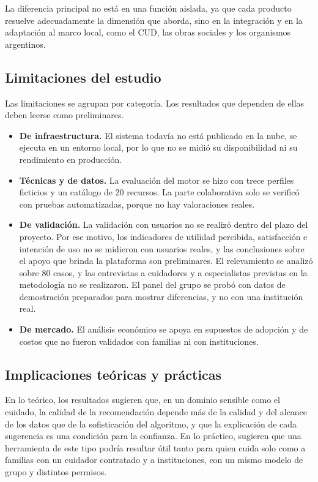 La diferencia principal no está en una función aislada, ya que cada producto resuelve adecuadamente la dimensión que aborda, sino en la integración y en la adaptación al marco local, como el CUD, las obras sociales y los organismos argentinos.

\subsection{Limitaciones del estudio}

Las limitaciones se agrupan por categoría. Los resultados que dependen de ellas deben leerse como preliminares.

\begin{itemize}
    \item \textbf{De infraestructura.} El sistema todavía no está publicado en la nube, se ejecuta en un entorno local, por lo que no se midió su disponibilidad ni su rendimiento en producción.
    \item \textbf{Técnicas y de datos.} La evaluación del motor se hizo con trece perfiles ficticios y un catálogo de 20 recursos. La parte colaborativa solo se verificó con pruebas automatizadas, porque no hay valoraciones reales.
    \item \textbf{De validación.} La validación con usuarios no se realizó dentro del plazo del proyecto. Por ese motivo, los indicadores de utilidad percibida, satisfacción e intención de uso no se midieron con usuarios reales, y las conclusiones sobre el apoyo que brinda la plataforma son preliminares. El relevamiento se analizó sobre 80 casos, y las entrevistas a cuidadores y a especialistas previstas en la metodología no se realizaron. El panel del grupo se probó con datos de demostración preparados para mostrar diferencias, y no con una institución real.
    \item \textbf{De mercado.} El análisis económico se apoya en supuestos de adopción y de costos que no fueron validados con familias ni con instituciones.
\end{itemize}

\subsection{Implicaciones teóricas y prácticas}

En lo teórico, los resultados sugieren que, en un dominio sensible como el cuidado, la calidad de la recomendación depende más de la calidad y del alcance de los datos que de la sofisticación del algoritmo, y que la explicación de cada sugerencia es una condición para la confianza. En lo práctico, sugieren que una herramienta de este tipo podría resultar útil tanto para quien cuida solo como a familias con un cuidador contratado y a instituciones, con un mismo modelo de grupo y distintos permisos.

